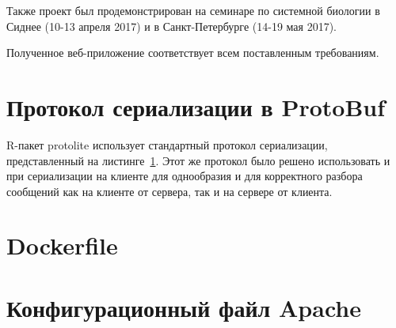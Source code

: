 \documentclass[annotation,specification]{itmo-student-thesis}
\begin{document}
Также проект был продемонстрирован на семинаре по системной биологии в Сиднее (10-13 апреля 2017) и в Санкт-Петербурге (14-19 мая 2017).

Полученное веб-приложение соответствует всем поставленным требованиям. 
\printmainbibliography

\appendix
\chapter{Протокол сериализации в ProtoBuf}\label{proto}
R-пакет protolite использует стандартный протокол сериализации, представленный на листинге~\ref{proto}. Этот же протокол было решено использовать и при сериализации на клиенте для однообразия и для корректного разбора сообщений как на клиенте от сервера, так и на сервере от клиента.

\chapter{Dockerfile}\label{dockerfile}


\chapter{Конфигурационный файл Apache}\label{apacheconf}

\end{document}
